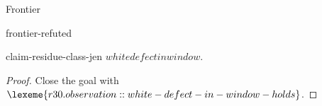 \begin{lexlean}{Frontier}
\begin{section}{frontier-refuted}
\begin{theorem}{claim-residue-class-jen}
\(whitedefectinwindow\).
\begin{proof}
Close the goal with \(\lexeme{r30.observation::white-defect-in-window-holds}\).
\end{proof}
\end{theorem}

\end{section}

\end{lexlean}
